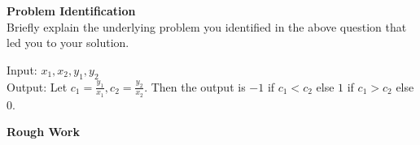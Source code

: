 \documentclass[a4paper]{exam}
\newcommand\heading[1]{\textbf{#1}}
\begin{document}
\begin{questions}
    \heading{Problem Identification}\\
    Briefly explain the underlying problem you identified in the above question that led you to your solution.

  \begin{mdframed}
    Input: $x_1,x_2,y_1,y_2$\\
    Output: Let $c_1= \frac{y_1}{x_1}, c_2= \frac{y_2}{x_2}$. Then the output is $-1$ if $c_1<c_2$ else $1$ if $c_1>c_2$ else $0$.
  \end{mdframed}

    \newpage
    \centerline{\heading{Rough Work}}
\end{questions}
\end{document}
